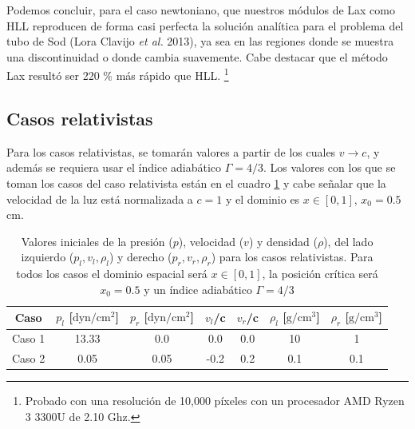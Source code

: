 \documentclass[12pt,a4paper]{book}
\begin{document}

Podemos concluir, para el caso newtoniano, que nuestros módulos de 
Lax como HLL reproducen de forma casi perfecta la solución analítica para el problema del tubo de Sod
(Lora Clavijo \emph{et al.} 2013), ya sea en las regiones donde se muestra una discontinuidad
o donde cambia suavemente. 
Cabe destacar que el método Lax resultó ser 220 \% más rápido que HLL.
\footnote{Probado con una resolución de 10,000 píxeles con un procesador AMD Ryzen 3 3300U de
2.10 Ghz.} 



\subsection{Casos relativistas} \label{subsec:casos_relativistas_1D}

Para los casos relativistas, se tomarán valores a partir de los cuales $v \rightarrow c$,
y además se requiera usar el índice adiabático $\Gamma = 4/3$. Los valores con los que se 
toman los casos del caso relativista están en el cuadro \ref{Cuadro_parametros_sod_tube_rel} y 
cabe señalar que la velocidad de la luz está normalizada a $c = 1$  y el dominio
es $x \in [0,1]$, $x_0 = 0.5$ cm.

\begin{table}[htbp]
  \begin{center}
  \begin{tabular}{|c|c|c|c|c|c|c|}
  \hline 
  \textbf{Caso} & \textbf{$p_l$} [$\text{dyn}/\text{cm}^2$] & \textbf{$p_r$} [$\text{dyn}/\text{cm}^2$] & \textbf{$v_l$}/c & \textbf{$v_r$}/c  & \textbf{$\rho_l$} [$\text{g}/\text{cm}^3$]& \textbf{$\rho_r$} [$\text{g}/\text{cm}^3$]\\ 
  \hline 
  Caso 1 & 13.33  & 0.0  & 0.0 & 0.0 & 10  & 1 \\ 
  \hline 
  Caso 2 & 0.05  & 0.05  & -0.2 & 0.2 & 0.1  & 0.1  \\ 
  \hline 
  \end{tabular}
  \caption{\label{Cuadro_parametros_sod_tube_rel} Valores iniciales 
  de la presión ($p$), velocidad ($v$)
  y densidad ($\rho$), del lado izquierdo ($p_l, v_l, \rho_l$) y derecho ($p_r, v_r, \rho_r$)
  para los casos relativistas. Para todos los
  casos el dominio espacial será $x \in [0,1]$, la 
  posición crítica será $x_0 = 0.5$ y un índice adiabático $\Gamma = 4/3$}
  \end{center}
\end{table}
\end{document}
